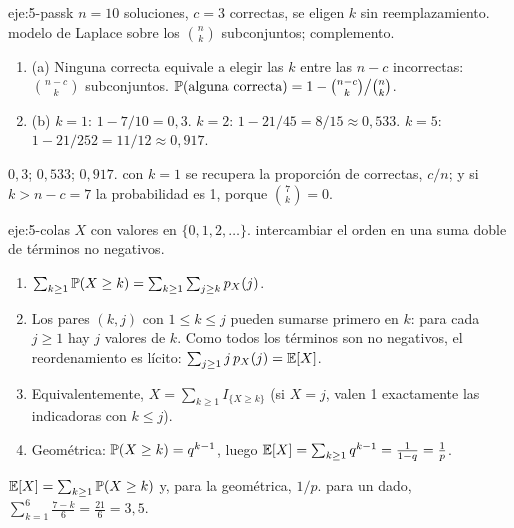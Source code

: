 \begin{solucion}{eje:5-passk}
\datos $n=10$ soluciones, $c=3$ correctas, se eligen $k$ sin reemplazamiento.
\planteamiento modelo de Laplace sobre los $\binom nk$ subconjuntos; complemento.
\pasos
\begin{enumerate}[label=\arabic*.]
  \item (a) Ninguna correcta equivale a elegir las $k$ entre las $n-c$ incorrectas: $\binom{n-c}k$ subconjuntos. $\mathbb{P}(\text{alguna correcta})=1-\binom{n-c}k\big/\binom nk$.
  \item (b) $k=1$: $1-7/10=0{,}3$. $k=2$: $1-21/45=8/15\approx0{,}533$. $k=5$: $1-21/252=11/12\approx0{,}917$.
\end{enumerate}
\resultado $0{,}3$; $0{,}533$; $0{,}917$.
\comprobacion con $k=1$ se recupera la proporción de correctas, $c/n$; y si $k>n-c=7$ la probabilidad es 1, porque $\binom7k=0$.
\end{solucion}

\begin{solucion}{eje:5-colas}
\datos $X$ con valores en $\{0,1,2,\dots\}$.
\planteamiento intercambiar el orden en una suma doble de términos no negativos.
\pasos
\begin{enumerate}[label=\arabic*.]
  \item $\sum_{k\ge1}\mathbb{P}(X\ge k)=\sum_{k\ge1}\sum_{j\ge k}p_X(j)$.
  \item Los pares $(k,j)$ con $1\le k\le j$ pueden sumarse primero en $k$: para cada $j\ge1$ hay $j$ valores de $k$. Como todos los términos son no negativos, el reordenamiento es lícito: $\sum_{j\ge1}j\,p_X(j)=\mathbb{E}[X]$.
  \item Equivalentemente, $X=\sum_{k\ge1}I_{\{X\ge k\}}$ (si $X=j$, valen 1 exactamente las indicadoras con $k\le j$).
  \item Geométrica: $\mathbb{P}(X\ge k)=q^{k-1}$, luego $\mathbb{E}[X]=\sum_{k\ge1}q^{k-1}=\frac1{1-q}=\frac1p$.
\end{enumerate}
\resultado $\mathbb{E}[X]=\sum_{k\ge1}\mathbb{P}(X\ge k)$ y, para la geométrica, $1/p$.
\comprobacion para un dado, $\sum_{k=1}^{6}\frac{7-k}{6}=\frac{21}6=3{,}5$.
\end{solucion}

